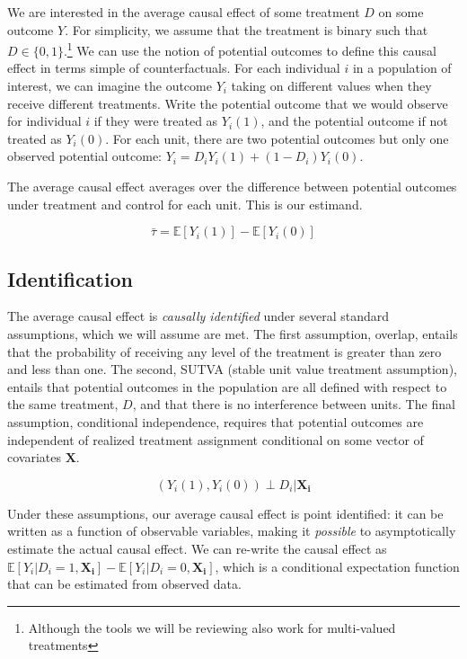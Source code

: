 \documentclass[hidelinks,11pt]{article}
\begin{document}
We are interested in the average causal effect of some treatment $D$ on some outcome $Y$. For simplicity, we assume that the treatment is binary such that $D \in \{0,1\}$.\footnote{Although the tools we will be reviewing also work for multi-valued treatments} We can use the notion of potential outcomes to define this causal effect in terms simple of counterfactuals. For each individual $i$ in a population of interest, we can imagine the outcome $Y_i$ taking on different values when they receive different treatments. Write the potential outcome that we would observe for individual $i$ if they were treated as $Y_i(1)$, and the potential outcome if not treated as $Y_i(0)$. For each unit, there are two potential outcomes but only one observed potential outcome: $Y_i = D_i Y_i(1) + (1-D_i)Y_i(0)$.

The average causal effect averages over the difference between potential outcomes under treatment and control for each unit. This is our estimand.

$$\bar \tau = \mathbb{E}[Y_i(1)]-\mathbb{E}[Y_i(0)]$$

\subsection{Identification}

The average causal effect is \emph{causally identified} under several standard assumptions, which we will assume are met. The first assumption, overlap, entails that the probability of receiving any level of the treatment is greater than zero and less than one. The second, SUTVA (stable unit value treatment assumption), entails that potential outcomes in the population are all defined with respect to the same treatment, $D$, and that there is no interference between units. The final assumption, conditional independence, requires that potential outcomes are independent of realized treatment assignment conditional on some vector of covariates $\boldsymbol{X}$.

$$(Y_i(1),Y_i(0)) \perp D_i | \boldsymbol{X_i}$$

Under these assumptions, our average causal effect is point identified: it can be written as a function of observable variables, making it \emph{possible} to asymptotically estimate the actual causal effect. We can re-write the causal effect as $\mathbb{E}[Y_i|D_i=1,\boldsymbol{X_i}]-\mathbb{E}[Y_i|D_i=0,\boldsymbol{X_i}]$, which is a conditional expectation function that can be estimated from observed data.
\end{document}
